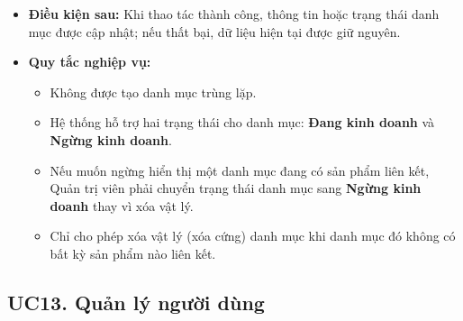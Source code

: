 \documentclass[12pt,a4paper]{article}
\begin{document}
\begin{itemize}
  \item \textbf{Điều kiện sau:} Khi thao tác thành công, thông tin hoặc trạng thái danh mục được cập nhật; nếu thất bại, dữ liệu hiện tại được giữ nguyên.

\item \textbf{Quy tắc nghiệp vụ:}
\begin{itemize}
\item Không được tạo danh mục trùng lặp.
\item Hệ thống hỗ trợ hai trạng thái cho danh mục: \textbf{Đang kinh doanh} và \textbf{Ngừng kinh doanh}.
\item Nếu muốn ngừng hiển thị một danh mục đang có sản phẩm liên kết, Quản trị viên phải chuyển trạng thái danh mục sang \textbf{Ngừng kinh doanh} thay vì xóa vật lý.
\item Chỉ cho phép xóa vật lý (xóa cứng) danh mục khi danh mục đó không có bất kỳ sản phẩm nào liên kết.
\end{itemize}


\end{itemize}


\subsection{UC13. Quản lý người dùng}
\end{document}
